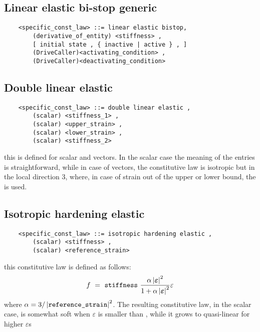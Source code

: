 \subsection{Linear elastic bi-stop generic}
\begin{verbatim}
    <specific_const_law> ::= linear elastic bistop,
        (derivative_of_entity) <stiffness> ,
        [ initial state , { inactive | active } , ]
        (DriveCaller)<activating_condition> ,
        (DriveCaller)<deactivating_condition>
\end{verbatim}
  
\subsection{Double linear elastic}
\begin{verbatim}
    <specific_const_law> ::= double linear elastic ,
        (scalar) <stiffness_1> ,
        (scalar) <upper_strain> ,
        (scalar) <lower_strain> ,
        (scalar) <stiffness_2>
\end{verbatim}
this is defined for scalar and  vectors. In the scalar case the
meaning of the entries is straightforward, while in case of  vectors,
the constitutive law is isotropic but in the local direction 3, where, in
case of strain out of the upper or lower bound, the  is
used.

\subsection{Isotropic hardening elastic}
\begin{verbatim}
    <specific_const_law> ::= isotropic hardening elastic ,
        (scalar) <stiffness> ,
        (scalar) <reference_strain>
\end{verbatim}
this constitutive law is defined as follows:
\begin{displaymath}
    f \ = \ \texttt{stiffness} \ \frac{
        \alpha\left| \boldsymbol{\varepsilon} \right|^2
    }{
        1+\alpha\left| \boldsymbol{\varepsilon} \right|^2
    }\varepsilon
\end{displaymath}
where $ \alpha=3/\left| \texttt{reference\_strain} \right|^2 $. The resulting
constitutive law, in the scalar case, is somewhat soft when
$ \varepsilon $ is smaller than , while it grows to
quasi-linear for higher $ \varepsilon$s

